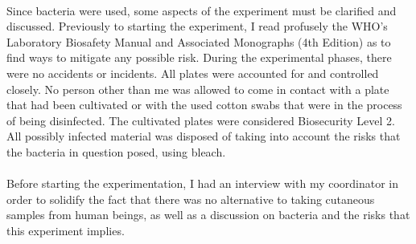 \paragraph{}Since bacteria were used, some aspects of the experiment must be clarified and discussed. Previously to starting the experiment, I read profusely the WHO's Laboratory Biosafety Manual and Associated Monographs (4th Edition)\cite{worldhealthorganizationLaboratoryBiosafetyManual2020} as to find ways to mitigate any possible risk. During the experimental phases, there were no accidents or incidents. All plates were accounted for and controlled closely. No person other than me was allowed to come in contact with a plate that had been cultivated or with the used cotton swabs that were in the process of being disinfected. The cultivated plates were considered Biosecurity Level 2. All possibly infected material was disposed of taking into account the risks that the bacteria in question posed, using bleach.
\paragraph{}Before starting the experimentation, I had an interview with my coordinator in order to solidify the fact that there was no alternative to taking cutaneous samples from human beings, as well as a discussion on bacteria and the risks that this experiment implies.
